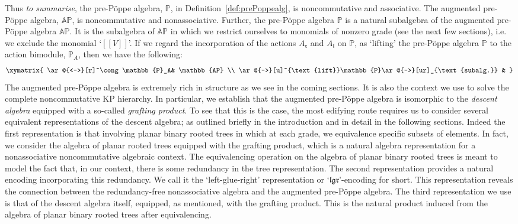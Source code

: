 \documentclass[5p,twocolumn]{elsarticle}
\newcommand*{\lb}{[\![}
\newcommand*{\rb}{]\!]}
\newcommand*{\el}{\mathfrak l}
\newcommand*{\gl}{\mathfrak g}
\newcommand*{\rl}{\mathfrak r}
\begin{document}
%
Thus \emph{to summarise}, the pre-P\"oppe algebra, $\mathbb{P}$, in Definition~\ref{def:prePoppealg}, is noncommutative and associative.
The augmented pre-P\"oppe algebra, $\mathbb{AP}$, is noncommutative and nonassociative.
Further, the pre-P\"oppe algebra $\mathbb{P}$ is a natural subalgebra of the augmented pre-P\"oppe algebra $\mathbb{AP}$.
It is the subalgebra of $\mathbb{AP}$ in which we restrict ourselves to monomials of nonzero grade (see the next few sections), i.e.\/ we exclude the monomial `$\lb V\rb$'.
If we regard the incorporation of the actions $A_{\rl}$ and $A_{\el}$ on $\mathbb{P}$,
as `lifting' the pre-P\"oppe algebra $\mathbb{P}$ to the action bimodule, $\mathbb{P}_A$, then we have the following:
%
\begin{equation*}
\xymatrix{
  \ar@{<->}[r]^\cong \mathbb{P}_A& \mathbb{AP} \\
  \ar@{->}[u]^{\text{lift}}\mathbb{P}\ar@{->}[ur]_{\text{subalg.}} & }
\end{equation*}
%
The augmented pre-P\"oppe algebra is extremely rich in structure as we see in the coming sections.
It is also the context we use to solve the complete noncommutative KP hierarchy.
In particular, we establish that the augmented pre-P\"oppe algebra is isomorphic to the \emph{descent algebra} equipped with a so-called \emph{grafting product}.
To see that this is the case, the most edifying route requires us to consider several equivalent representations of the descent algebra;
as outlined briefly in the introduction and in detail in the following sections.
Indeed the first representation is that involving planar binary rooted trees in which at each grade, we equivalence specific subsets of elements.
In fact, we consider the algebra of planar rooted trees equipped with the grafting product, which is a natural algebra representation for a nonassociative noncommutative algebraic context. 
The equivalencing operation on the algebra of planar binary rooted trees is meant to model the fact that, in our context, there is some redundancy in the tree representation.
The second representation provides a natural encoding incorporating this redundancy. We call it the `left-glue-right' representation or `$\el\gl\rl$'-encoding for short.
This representation reveals the connection between the redundancy-free nonassociative algebra and the augmented pre-P\"oppe algebra. 
The third representation we use is that of the descent algebra itself, equipped, as mentioned, with the grafting product. 
This is the natural product induced from the algebra of planar binary rooted trees after equivalencing.
\end{document}
